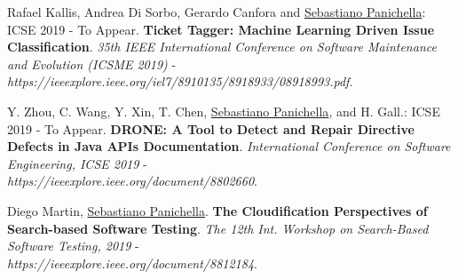 \documentclass[10pt]{article}
\begin{document}
\begin{bibenum}
      \item \label{Cm11}  Rafael Kallis, Andrea Di Sorbo, Gerardo Canfora and \underline{Sebastiano Panichella}:   ICSE 2019 - To Appear. \textbf{Ticket Tagger: Machine Learning Driven Issue Classification}.  \emph{35th IEEE International Conference on Software Maintenance and Evolution (ICSME 2019)} - \\\textit{https://ieeexplore.ieee.org/iel7/8910135/8918933/08918993.pdf}. %
      \item \label{Cm10}  Y. Zhou, C. Wang, Y. Xin, T. Chen, \underline{Sebastiano Panichella}, and H. Gall.:   ICSE 2019 - To Appear. \textbf{DRONE: A Tool to Detect and Repair Directive Defects in Java APIs Documentation}.  \emph{International Conference on Software Engineering, ICSE 2019} - \\\textit{https://ieeexplore.ieee.org/document/8802660}. %
      
            \item \label{Cm9}  Diego Martin,  \underline{Sebastiano Panichella}. \textbf{The Cloudification Perspectives of Search-based Software Testing}.  \emph{The 12th Int. Workshop on Search-Based Software Testing, 2019} - \\\textit{https://ieeexplore.ieee.org/document/8812184}.


\end{bibenum}
\end{document}
